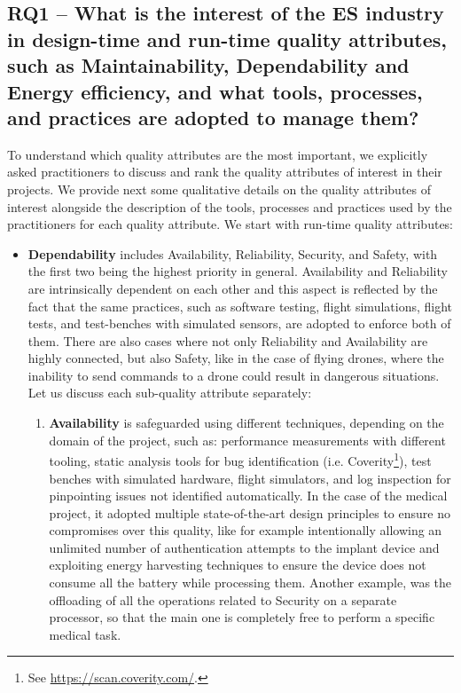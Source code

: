 \subsection{RQ1 -- What is the interest of the ES industry in design-time and run-time quality attributes,  such  as  Maintainability,  Dependability  and  Energy  efficiency,  and what tools, processes, and practices are adopted to manage them?}
To understand which quality attributes are the most important, we explicitly asked practitioners to discuss and rank the quality attributes of interest in their projects.
We provide next some qualitative details on the quality attributes of interest alongside the description of the tools, processes and practices used by the practitioners for each quality attribute.
We start with run-time quality attributes:
\begin{itemize}
    \item \textbf{Dependability} includes Availability, Reliability, Security, and Safety, with the first two being the highest priority in general. Availability and Reliability are intrinsically dependent on each other and this aspect is reflected by the fact that the same practices, such as software testing, flight simulations, flight tests, and test-benches with simulated sensors, are adopted to enforce both of them.
    There are also cases where not only Reliability and Availability are highly connected, but also Safety, like in the case of flying drones, where the inability to send commands to a drone could result in dangerous situations.
    Let us discuss each sub-quality attribute separately:
    \begin{enumerate}[label=\alph*)]
        \item \textbf{Availability} is safeguarded using different techniques, depending on the domain of the project, such as: performance measurements with different tooling, static analysis tools for bug identification (i.e. Coverity\footnote{See \url{https://scan.coverity.com/}.}), test benches with simulated hardware, flight simulators, and log inspection for pinpointing issues not identified automatically. In the case of the medical project, it adopted multiple state-of-the-art design principles to ensure no compromises over this quality, like for example intentionally allowing an unlimited number of authentication attempts to the implant device and exploiting energy harvesting techniques to ensure the device does not consume all the battery while processing them. Another example, was the offloading of all the operations related to Security on a separate processor, so that the main one is completely free to perform a specific medical task.
        

\end{enumerate}
\end{itemize}
